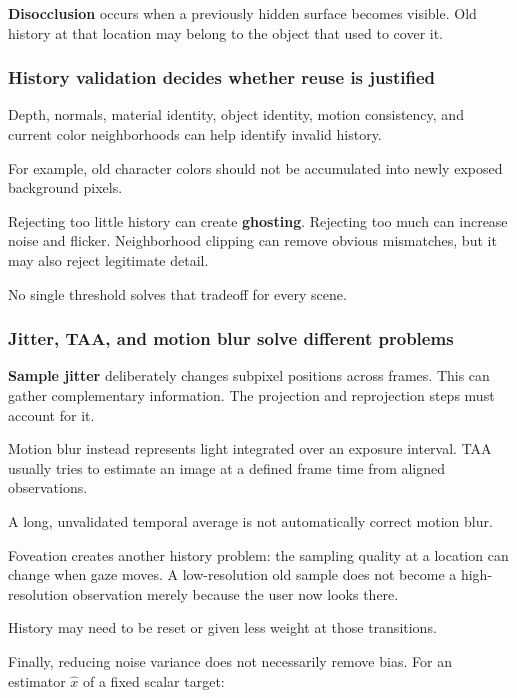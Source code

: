 \textbf{Disocclusion} occurs when a previously hidden surface becomes visible. Old history at that location may belong to the object that used to cover it.

\subsubsection{History validation decides whether reuse is justified}\label{04-visual-computing-ii-ch043-history-validation-decides-whether-reuse-is-justified}

Depth, normals, material identity, object identity, motion consistency, and current color neighborhoods can help identify invalid history.

For example, old character colors should not be accumulated into newly exposed background pixels.

Rejecting too little history can create \textbf{ghosting}. Rejecting too much can increase noise and flicker. Neighborhood clipping can remove obvious mismatches, but it may also reject legitimate detail.

No single threshold solves that tradeoff for every scene.

\subsubsection{Jitter, TAA, and motion blur solve different problems}\label{04-visual-computing-ii-ch043-jitter-taa-and-motion-blur-solve-different-problems}

\textbf{Sample jitter} deliberately changes subpixel positions across frames. This can gather complementary information. The projection and reprojection steps must account for it.

Motion blur instead represents light integrated over an exposure interval. TAA usually tries to estimate an image at a defined frame time from aligned observations.

A long, unvalidated temporal average is not automatically correct motion blur.

Foveation creates another history problem: the sampling quality at a location can change when gaze moves. A low-resolution old sample does not become a high-resolution observation merely because the user now looks there.

History may need to be reset or given less weight at those transitions.

Finally, reducing noise variance does not necessarily remove bias. For an estimator \(\hat x\) of a fixed scalar target:


